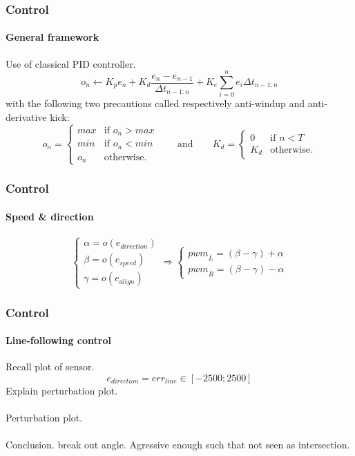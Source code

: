 \documentclass{beamer}
\begin{document}
\begin{frame}
\frametitle{Control}
\framesubtitle{General framework}
Use of classical PID controller.
$$ 
o_n \leftarrow K_p e_n + K_d\frac{e_n - e_{n-1}}{\Delta t_{n-1:n}} + K_e\sum_{i=0}^{n}{e_i \Delta t_{n-1:n}}
$$
with the following two precautions called respectively anti-windup and anti-derivative kick:
$$
o_n = \left\{
    \begin{array}{ll}
        max & \mbox{if } o_n > max \\
        min & \mbox{if } o_n < min \\
        o_n & \mbox{otherwise.}
    \end{array}
\right.
\qquad\text{and}\qquad	
K_d = \left\{
    \begin{array}{ll}
        0 & \mbox{if } n < T \\
       K_d & \mbox{otherwise.}
    \end{array}
\right.
$$
\end{frame}


\begin{frame}
\frametitle{Control}
\framesubtitle{Speed \& direction}
$$ 
\left\{
    \begin{array}{ll}
		\alpha = o(e_{direction}) \\[0.3cm]
		\beta = o(e_{speed}) \\[0.3cm]
		\gamma = o(e_{align})
	\end{array}
\right.
\Rightarrow
\left\{
    \begin{array}{ll}
		{pwm}_L =  (\beta -\gamma) + \alpha \\
		{pwm}_R = (\beta - \gamma) - \alpha
	\end{array}
\right.
$$
\end{frame}


\begin{frame}
\frametitle{Control}
\framesubtitle{Line-following control}
Recall plot of sensor. 
$$ 
e_{direction} =err_{line} \in [-2500;2500]
$$
Explain perturbation plot.\\~\\
Perturbation plot.\\~\\
Conclusion. break out angle. Agressive enough such that not seen as intersection.
\end{frame}

\end{document}
